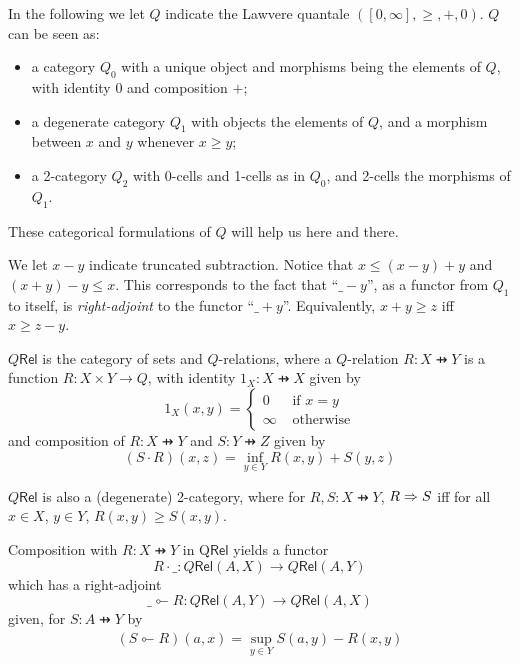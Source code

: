 

In the following we let $Q$ indicate the Lawvere quantale $([0,\infty], \geq, +,0)$. 
$Q$ can be seen as:
\begin{itemize}
\item a category $Q_{0}$ with a unique object and morphisms being the elements of $Q$, with identity 0 and composition $+$;

\item a degenerate category $Q_{1}$ with objects the elements of $Q$, and  
a morphism between $x$ and $y$ whenever $x\geq y$;

\item a 2-category $Q_{2}$ with 0-cells and 1-cells as in $Q_{0}$, and 2-cells the morphisms of $Q_{1}$.

\end{itemize}
These categorical formulations of $Q$ will help us here and there. 

We let $x-y$ indicate truncated subtraction. Notice that 
$x \leq (x-y)+y$ and $(x+y)-y\leq x$. This corresponds to the fact that ``$\_-y$'', as a functor from $
Q_{1}$ to itself, 
 is \emph{right-adjoint} to the functor ``$\_+y$''. Equivalently, 
 $x+y \geq z $ iff $x\geq z-y$.




$Q\mathsf{Rel}$ is the category of sets and $Q$-relations, where a $Q$-relation 
$R:X\pfun Y$ is a function $R: X\times Y\to Q$, with identity $1_{X}:X\pfun X$ given by 
$$1_{X}(x,y)=\begin{cases} 0 & \text{ if }x=y\\ \infty & \text{ otherwise}\end{cases}$$
and composition of $R:X\pfun Y$ and $S:Y\pfun Z$ given by 
$$
(S\cdot R)(x,z)= \inf_{y\in Y}R(x,y)+S(y,z)
$$ 

\begin{remark}
$Q\mathsf{Rel}$ is also a (degenerate) 2-category, where for $R,S:X\pfun Y$, $R\Rightarrow S$ iff for all $x\in X$, $y\in Y$, $R(x,y)\geq S(x,y)$. 

\end{remark}


Composition with $R:X\pfun Y$ in Q$\mathsf{Rel}$ yields a functor
$$
R\cdot \_ : Q\mathsf{Rel}(A,X)   \longrightarrow Q\mathsf{Rel}(A,Y)
$$
which
has a right-adjoint
$$
\_ \multimapinv R : Q\mathsf{Rel}(A,Y)   \longrightarrow Q\mathsf{Rel}(A,X)
$$
given, for $S:A\pfun Y$ by 
\begin{align*}
(S\multimapinv R)(a,x)= \sup_{y\in Y}S(a,y) -R(x,y)
\end{align*}

